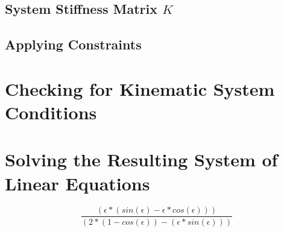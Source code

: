 \subsection{System Stiffness Matrix $K$}
\label{sec:asmK}

\subsection{Applying Constraints}
\label{sec:applyconst}


\section{Checking for Kinematic System Conditions}
\label{sec:kinesyscheck}


\section{Solving the Resulting System of Linear Equations}
\label{sec:solver}




\begin{equation} \label{constA}
\frac{(\epsilon * (sin(\epsilon) - \epsilon * cos(\epsilon)))}
{(2 * (1 - cos(\epsilon)) - (\epsilon * sin(\epsilon)))}
\end{equation}